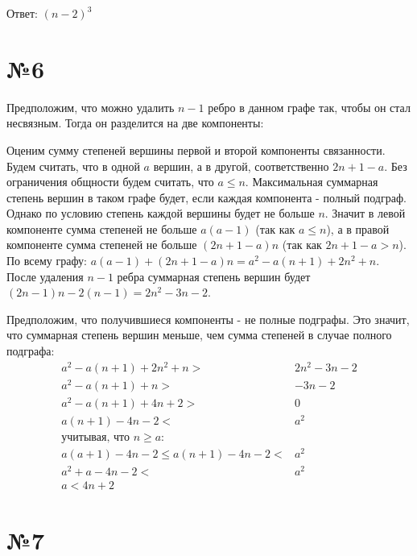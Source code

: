 \documentclass[12pt, tikz]{article}
\begin{document}
	Ответ: $(n - 2)^3$
	
	\section*{№6}

	
	Предположим, что можно удалить $n - 1$ ребро в данном графе так, чтобы он стал несвязным. Тогда он разделится на две компоненты:
	

	Оценим сумму степеней вершины первой и второй компоненты связанности. 
	Будем считать, что в одной $a$ вершин, а в другой, соответственно $2n + 1 - a$.
	Без ограничения общности будем считать, что $a \leqslant n$.
	Максимальная суммарная степень вершин в таком графе будет, если каждая компонента - полный подграф. 
	Однако по условию степень каждой вершины будет не больше $n$. 
	Значит в левой компоненте сумма степеней не больше $a(a - 1)$ (так как $a \leqslant n$),
	а в правой компоненте сумма степеней не больше $(2n + 1 - a)n$ (так как $2n + 1 - a > n$).
	По всему графу:
	$a(a - 1) + (2n + 1 - a)n = a^2-a(n+1)+2n^2+n$. После удаления $n - 1$ ребра суммарная степень вершин будет
	$(2n - 1)n - 2(n - 1) = 2n^2-3n-2$.
	
	Предположим, что получившиеся компоненты - не полные подграфы. 
	Это значит, что суммарная степень вершин меньше, чем сумма степеней в случае полного подграфа:
	\begin{align*}
	a^2-a(n+1)+2n^2+n >& 2n^2-3n-2 \\
	a^2-a(n+1)+n >&-3n-2 \\
	a^2-a(n+1)+4n + 2 >& 0 \\
	a(n+1)-4n - 2 <& a^2 \\
	\mbox{учитывая, что $n \geqslant a$}:\\	
	a(a+1)-4n - 2 \leqslant a(n+1)-4n - 2 <& a^2 \\
	a^2 + a - 4n - 2 <& a^2 \\
	a < 4n + 2
	\end{align*}
	
	\section*{№7}
	
	
	
\end{document}
